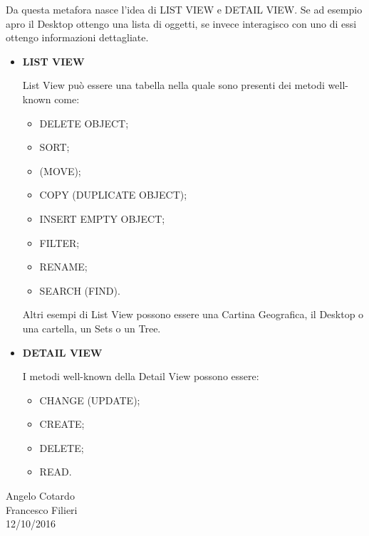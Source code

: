 Da questa metafora nasce l’idea di LIST VIEW e DETAIL VIEW. Se ad esempio apro il Desktop ottengo una lista di oggetti, se invece interagisco con uno di essi ottengo informazioni dettagliate. 

\begin{itemize}

\item{\textbf{LIST VIEW}}

List View può essere una tabella nella quale sono presenti dei metodi well-known come:

\begin{itemize}

\item DELETE OBJECT;
\item SORT;
\item (MOVE);
\item COPY (DUPLICATE OBJECT);
\item INSERT EMPTY OBJECT;
\item FILTER;
\item RENAME;
\item SEARCH (FIND).

\end{itemize}

Altri esempi di List View possono essere una Cartina Geografica, il Desktop o una cartella, un Sets o un Tree. 

\item{\textbf{DETAIL VIEW}}

I metodi well-known della Detail View possono essere:

\begin{itemize}

\item CHANGE (UPDATE);
\item CREATE;
\item DELETE;
\item READ.

\end{itemize}

\end{itemize}

\begin{flushright}Angelo Cotardo\\Francesco Filieri\\12/10/2016\end{flushright}

